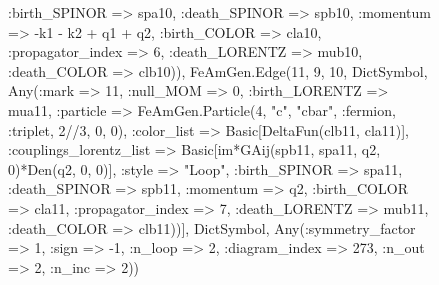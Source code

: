 \documentclass{revtex4}
\begin{document}
\begin{figure}[!htb]
\begin{center}
{:birth_SPINOR => spa10, :death_SPINOR => spb10, :momentum => -k1 - k2 + q1 + q2, :birth_COLOR => cla10, :propagator_index => 6, :death_LORENTZ => mub10, :death_COLOR => clb10)), FeAmGen.Edge(11, 9, 10, Dict{Symbol, Any}(:mark => 11, :null_MOM => 0, :birth_LORENTZ => mua11, :particle => FeAmGen.Particle(4, "c", "cbar", :fermion, :triplet, 2//3, 0, 0), :color_list => Basic[DeltaFun(clb11, cla11)], :couplings_lorentz_list => Basic[im*GAij(spb11, spa11, q2, 0)*Den(q2, 0, 0)], :style => "Loop", :birth_SPINOR => spa11, :death_SPINOR => spb11, :momentum => q2, :birth_COLOR => cla11, :propagator_index => 7, :death_LORENTZ => mub11, :death_COLOR => clb11))], Dict{Symbol, Any}(:symmetry_factor => 1, :sign => -1, :n_loop => 2, :diagram_index => 273, :n_out => 2, :n_inc => 2)) 
}
\end{center}
\end{figure}
\end{document}
